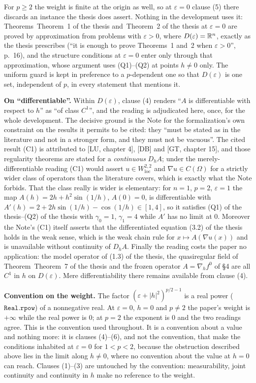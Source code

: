 \begin{definition}
For $p\ge2$ the weight is finite at the origin as well, so at $\varepsilon=0$
clause (5) there discards an instance the thesis does assert.  Nothing in the
development uses it: Theorems~Theorem~1 of the thesis and~Theorem~2 of the thesis at $\varepsilon=0$ are
proved by approximation from problems with $\varepsilon>0$, where
$D(\varepsilon)=\mathbb{R}^n$, exactly as the thesis prescribes (``it is enough to prove Theorems~1 and~2 when $\varepsilon>0$'',
p.~16), and the structure conditions at $\varepsilon=0$ enter only through that
approximation, whose argument uses (Q1)--(Q2) at points $h\ne0$ only.  The uniform
guard is kept in preference to a $p$-dependent one so that
$D(\varepsilon)$ is one set, independent of $p$, in every statement that
mentions it.

\textbf{On ``differentiable''.}  Within $D(\varepsilon)$, clause (4) renders
``$A$ is differentiable with respect to $h$'' as ``of class $C^1$'', and the
reading is adjudicated here, once, for the whole development.  The decisive
ground is the Note for the formalization's own constraint on the results it
permits to be cited: they ``must be stated as in the literature and not in a
stronger form, and they must not be vacuous''.  The cited result (C1) is
attributed to [LU, chapter 4], [DB] and [GT, chapter 15], and those regularity
theorems are stated for a \emph{continuous} $D_hA$; under the merely-differentiable
reading (C1) would assert $u\in W^{2,2}_{\mathrm{loc}}$ and
$\nabla u\in C(\Omega)$ for a strictly wider class of operators than the
literature covers, which is exactly what the Note forbids.  That the class
really is wider is elementary: for $n=1$, $p=2$, $\varepsilon=1$ the map
$A(h)=2h+h^2\sin(1/h)$, $A(0)=0$, is differentiable with
$A'(h)=2+2h\sin(1/h)-\cos(1/h)\in[1,4]$, so it satisfies
(Q1) of the thesis--(Q2) of the thesis with $\gamma_0=1$, $\gamma_1=4$ while $A'$ has no
limit at $0$.  Moreover the Note's (C1) itself asserts that the differentiated
equation (3.2) of the thesis holds in the weak sense, which is the weak chain rule
for $x\mapsto A(\nabla u(x))$ and is unavailable without continuity of $D_hA$.
Finally the reading costs the paper no application: the model operator of
(1.3) of the thesis, the quasiregular field of Theorem~Theorem~7 of the thesis and the frozen
operator $A=\nabla_hf^0$ of \S4 are all $C^1$ in $h$ on $D(\varepsilon)$.  Mere
differentiability there remains available from clause (4).

\textbf{Convention on the weight.}  The factor
$(\varepsilon+|h|^2)^{p/2-1}$ is a real power ($\mathtt{Real.rpow}$) of a
nonnegative real.  At $\varepsilon=0$, $h=0$ and $p\ne2$ the paper's weight is
$+\infty$ while the real power is $0$; at $p=2$ the exponent is $0$ and the two
readings agree.  This is the convention used throughout.  It is a convention
about a value and nothing more: it is clauses (4)--(6), and not the convention,
that make the conditions inhabited at $\varepsilon=0$ for $1<p<2$, because the
obstruction described above lies in the limit along $h\ne0$, where no convention
about the value at $h=0$ can reach.  Clauses (1)--(3) are untouched by the
convention: measurability, joint continuity and continuity in $h$ make no
reference to the weight.
\end{definition}

